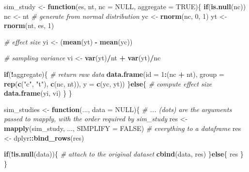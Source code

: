 \documentclass[
  man,floatsintext]{apa6}
\newenvironment{Shaded}{\begin{snugshade}}{\end{snugshade}}
\newcommand{\AttributeTok}[1]{\textcolor[rgb]{0.13,0.29,0.53}{#1}}
\newcommand{\CommentTok}[1]{\textcolor[rgb]{0.56,0.35,0.01}{\textit{#1}}}
\newcommand{\ConstantTok}[1]{\textcolor[rgb]{0.56,0.35,0.01}{#1}}
\newcommand{\ControlFlowTok}[1]{\textcolor[rgb]{0.13,0.29,0.53}{\textbf{#1}}}
\newcommand{\DecValTok}[1]{\textcolor[rgb]{0.00,0.00,0.81}{#1}}
\newcommand{\FunctionTok}[1]{\textcolor[rgb]{0.13,0.29,0.53}{\textbf{#1}}}
\newcommand{\NormalTok}[1]{#1}
\newcommand{\OtherTok}[1]{\textcolor[rgb]{0.56,0.35,0.01}{#1}}
\newcommand{\SpecialCharTok}[1]{\textcolor[rgb]{0.81,0.36,0.00}{\textbf{#1}}}
\newcommand{\StringTok}[1]{\textcolor[rgb]{0.31,0.60,0.02}{#1}}
\begin{document}
\begin{Shaded}
\begin{Highlighting}[]

\NormalTok{sim\_study }\OtherTok{\textless{}{-}} \ControlFlowTok{function}\NormalTok{(es, nt, }\AttributeTok{nc =} \ConstantTok{NULL}\NormalTok{, }\AttributeTok{aggregate =} \ConstantTok{TRUE}\NormalTok{)\{}
  \ControlFlowTok{if}\NormalTok{(}\FunctionTok{is.null}\NormalTok{(nc)) nc }\OtherTok{\textless{}{-}}\NormalTok{ nt}
  \CommentTok{\# generate from normal distribution}
\NormalTok{  yc }\OtherTok{\textless{}{-}} \FunctionTok{rnorm}\NormalTok{(nc, }\DecValTok{0}\NormalTok{, }\DecValTok{1}\NormalTok{)}
\NormalTok{  yt }\OtherTok{\textless{}{-}} \FunctionTok{rnorm}\NormalTok{(nt, es, }\DecValTok{1}\NormalTok{)}
  
  \CommentTok{\# effect size}
\NormalTok{  yi }\OtherTok{\textless{}{-}}\NormalTok{ (}\FunctionTok{mean}\NormalTok{(yt) }\SpecialCharTok{{-}} \FunctionTok{mean}\NormalTok{(yc))}
  
  \CommentTok{\# sampling variance}
\NormalTok{  vi }\OtherTok{\textless{}{-}} \FunctionTok{var}\NormalTok{(yt)}\SpecialCharTok{/}\NormalTok{nt }\SpecialCharTok{+} \FunctionTok{var}\NormalTok{(yt)}\SpecialCharTok{/}\NormalTok{nc}
  
  \ControlFlowTok{if}\NormalTok{(}\SpecialCharTok{!}\NormalTok{aggregate)\{}
    \CommentTok{\# return raw data}
    \FunctionTok{data.frame}\NormalTok{(}\AttributeTok{id =} \DecValTok{1}\SpecialCharTok{:}\NormalTok{(nc }\SpecialCharTok{+}\NormalTok{ nt),}
               \AttributeTok{group =} \FunctionTok{rep}\NormalTok{(}\FunctionTok{c}\NormalTok{(}\StringTok{"c"}\NormalTok{, }\StringTok{"t"}\NormalTok{), }\FunctionTok{c}\NormalTok{(nc, nt)),}
               \AttributeTok{y =} \FunctionTok{c}\NormalTok{(yc, yt))}
\NormalTok{  \}}\ControlFlowTok{else}\NormalTok{\{}
    \CommentTok{\# compute effect size}
    \FunctionTok{data.frame}\NormalTok{(yi, vi)}
\NormalTok{  \}}
\NormalTok{\}}

\NormalTok{sim\_studies }\OtherTok{\textless{}{-}} \ControlFlowTok{function}\NormalTok{(..., }\AttributeTok{data =} \ConstantTok{NULL}\NormalTok{)\{}
  \CommentTok{\# ... (dots) are the arguments passed to mapply, with the order required by sim\_study}
\NormalTok{  res }\OtherTok{\textless{}{-}} \FunctionTok{mapply}\NormalTok{(sim\_study, ..., }\AttributeTok{SIMPLIFY =} \ConstantTok{FALSE}\NormalTok{)}
  \CommentTok{\# everything to a dataframe}
\NormalTok{  res }\OtherTok{\textless{}{-}}\NormalTok{ dplyr}\SpecialCharTok{::}\FunctionTok{bind\_rows}\NormalTok{(res)}
  
  \ControlFlowTok{if}\NormalTok{(}\SpecialCharTok{!}\FunctionTok{is.null}\NormalTok{(data))\{}
    \CommentTok{\# attach to the original dataset}
    \FunctionTok{cbind}\NormalTok{(data, res)}
\NormalTok{  \}}\ControlFlowTok{else}\NormalTok{\{}
\NormalTok{    res}
\NormalTok{  \}}
\NormalTok{\}}
\end{Highlighting}
\end{Shaded}
\end{document}
